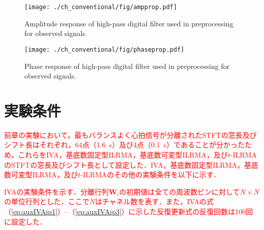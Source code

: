 \begin{figure}[!t]
\centering
\texttt{[image: ./ch\_conventional/fig/ampprop.pdf]}
\caption{Amplitude response of high-pass digital filter used in preprocessing for observed signals.}
\label{fig:ampres}
\end{figure}

\begin{figure}[!t]
\centering
\texttt{[image: ./ch\_conventional/fig/phaseprop.pdf]}
\caption{Phase response of high-pass digital filter used in preprocessing for observed signals.}
\label{fig:phaseres}
\end{figure}

\section{実験条件}
\label{sec:conv:expcond5}

\textcolor{red}{前章の実験において，最もバランスよく心拍信号が分離されたSTFTの窓長及びシフト長はそれぞれ，64点（1.6~s）及び4点（0.1~s）であることが分かったため，これらをIVA，基底数固定型ILRMA，基底数可変型ILRMA，及び$t$-ILRMAのSTFTの窓長及びシフト長として設定した．IVA，基底数固定型ILRMA，基底数可変型ILRMA，及び$t$-ILRMAのその他の実験条件を以下に示す．}

\textcolor{red}{IVAの実験条件を示す．分離行列$\bm{W}_{i}$の初期値は全ての周波数ビンに対して$N\times N$の単位行列とした．ここで$N$はチャネル数を表す．また，IVAの式（\ref{ep:auxIVAip1}）--（\ref{ep:auxIVAip3}）に示した反復更新式の反復回数は100回に設定した．}

